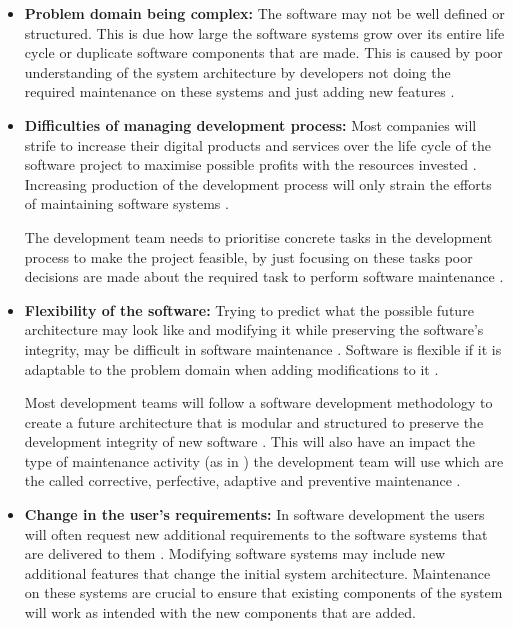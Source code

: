 \begin{itemize}
	\item \textbf{Problem domain being complex:} The software may not be well defined or structured. This is due how large the software systems grow over its entire life cycle or duplicate software components that are made. This is caused by poor understanding of the system architecture by developers not doing the required maintenance on these systems and just adding new features \cite{Galster2019, Booch1986}.
	\item \textbf{Difficulties of managing development process:} Most companies will strife to increase their digital products and services over the life cycle of the software project to maximise possible profits with the resources invested \cite{Niu2018}. Increasing production of the development process will only strain the efforts of maintaining software systems \cite{Sneed2004}.\par The development team needs to prioritise concrete tasks in the development process to make the project feasible, by just focusing on these tasks poor decisions are made about the required task to perform software maintenance \cite{Galster2019, Ogheneovo2014, Lenarduzzi2017}. 
	\item \textbf{Flexibility of the software:} Trying to predict what the possible future architecture may look like and modifying it while preserving the software's integrity, may be difficult in software maintenance \cite{Garlan1999}. Software is flexible if it is adaptable to the problem domain when adding modifications to it \cite{Ogheneovo2014}.\par Most development teams will follow a software development methodology to create a future architecture that is modular and structured to preserve the development integrity of new software \cite{Vijayasarathy2016, Rehman2018}. This will also have an impact the type of maintenance activity (as in ) the development team will use which are the called corrective, perfective, adaptive and preventive maintenance \cite{FrancisThamburaj2017, Hasan2012, Stojanov2017, Snipes2018}.
	\item \textbf{Change in the user's requirements:} In software development the users will often request new additional requirements to the software systems that are delivered to them \cite{Ogheneovo2014}. Modifying software systems may include new additional features that change the initial system architecture. Maintenance on these systems are crucial to ensure that existing components of the system will work as intended with the new components that are added.
\end{itemize}

